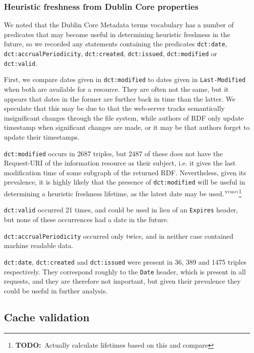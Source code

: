 \documentclass{llncs}
\newcommand{\rdfterm}[1]{\texttt{#1}}
\newcommand{\httph}[1]{\texttt{#1}}
\newcommand{\todo}[1]{\ensuremath{^{\textrm{\tiny{TODO}\normalsize}}}\footnote{\textbf{TODO:}~#1}}
\begin{document}
\subsubsection{Heuristic freshness from Dublin Core properties}

We noted that the Dublin Core Metadata terms vocabulary has a number
of predicates that may become useful in determining heuristic
freshness in the future, so we recorded any statements containing the
predicates \rdfterm{dct:date}, \rdfterm{dct:accrualPeriodicity},
\rdfterm{dct:created}, \rdfterm{dct:issued}, \rdfterm{dct:modified} or
\rdfterm{dct:valid}.

First, we compare dates given in \rdfterm{dct:modified} to dates given
in \httph{Last-Modified} when both are available for a resource. They
are often not the same, but it appears that dates in the former are
further back in time than the latter. We speculate that this may be
due to that the web-server tracks semantically insignificant changes
through the file system, while authors of RDF only update timestamp
when significant changes are made, or it may be that authors forget to
update their timestamps.

\rdfterm{dct:modified} occurs in 2687 triples, but 2487 of these does
not have the Request-URI of the information resource as their subject,
i.e. it gives the last modification time of some subgraph of the
returned RDF. Nevertheless, given its prevalence, it is highly likely
that the presence of \rdfterm{dct:modified} will be useful in
determining a heuristic freshness lifetime, as the latest date may be
used.\todo{Actually calculate lifetimes based on this and compare}

\rdfterm{dct:valid} occurred 21 times, and could be used in lieu of an
\httph{Expires} header, but none of these occurrences had a date in the
future.

\rdfterm{dct:accrualPeriodicity} occurred only twice, and in neither
case contained machine readable data.

\rdfterm{dct:date}, \rdfterm{dct:created} and \rdfterm{dct:issued}
were present in 36, 389 and 1475 triples respectively. They correspond
roughly to the \httph{Date} header, which is present in all requests,
and they are therefore not important, but given their prevalence they
could be useful in further analysis.

\subsection{Cache validation}
\end{document}

